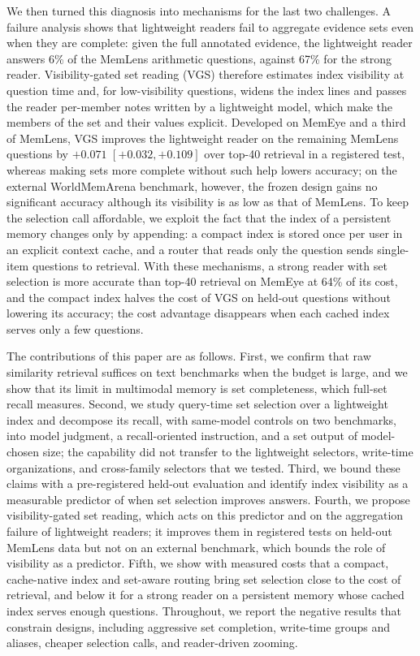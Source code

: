 We then turned this diagnosis into mechanisms for the last two challenges. A failure analysis shows that lightweight readers fail to aggregate evidence sets even when they are complete: given the full annotated evidence, the lightweight reader answers 6\% of the MemLens arithmetic questions, against 67\% for the strong reader. Visibility-gated set reading (VGS) therefore estimates index visibility at question time and, for low-visibility questions, widens the index lines and passes the reader per-member notes written by a lightweight model, which make the members of the set and their values explicit. Developed on MemEye and a third of MemLens, VGS improves the lightweight reader on the remaining MemLens questions by $+0.071$ $[+0.032, +0.109]$ over top-40 retrieval in a registered test, whereas making sets more complete without such help lowers accuracy; on the external WorldMemArena benchmark, however, the frozen design gains no significant accuracy although its visibility is as low as that of MemLens. To keep the selection call affordable, we exploit the fact that the index of a persistent memory changes only by appending: a compact index is stored once per user in an explicit context cache, and a router that reads only the question sends single-item questions to retrieval. With these mechanisms, a strong reader with set selection is more accurate than top-40 retrieval on MemEye at 64\% of its cost, and the compact index halves the cost of VGS on held-out questions without lowering its accuracy; the cost advantage disappears when each cached index serves only a few questions.

The contributions of this paper are as follows. First, we confirm that raw similarity retrieval suffices on text benchmarks when the budget is large, and we show that its limit in multimodal memory is set completeness, which full-set recall measures. Second, we study query-time set selection over a lightweight index and decompose its recall, with same-model controls on two benchmarks, into model judgment, a recall-oriented instruction, and a set output of model-chosen size; the capability did not transfer to the lightweight selectors, write-time organizations, and cross-family selectors that we tested. Third, we bound these claims with a pre-registered held-out evaluation and identify index visibility as a measurable predictor of when set selection improves answers. Fourth, we propose visibility-gated set reading, which acts on this predictor and on the aggregation failure of lightweight readers; it improves them in registered tests on held-out MemLens data but not on an external benchmark, which bounds the role of visibility as a predictor. Fifth, we show with measured costs that a compact, cache-native index and set-aware routing bring set selection close to the cost of retrieval, and below it for a strong reader on a persistent memory whose cached index serves enough questions. Throughout, we report the negative results that constrain designs, including aggressive set completion, write-time groups and aliases, cheaper selection calls, and reader-driven zooming.
